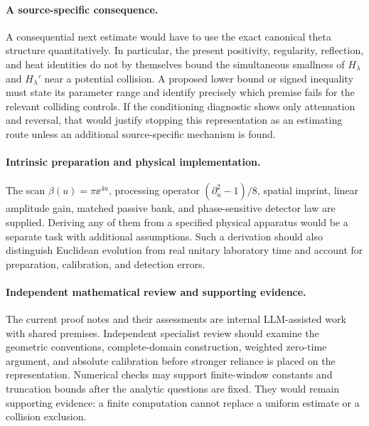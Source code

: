 \paragraph{A source-specific consequence.}
A consequential next estimate would have to use the exact canonical
theta structure quantitatively. In particular, the present positivity,
regularity, reflection, and heat identities do not by themselves bound
the simultaneous smallness of $H_\lambda$ and $H_\lambda'$ near a
potential collision. A proposed lower bound or signed inequality must
state its parameter range and identify precisely which premise fails
for the relevant colliding controls. If the conditioning diagnostic
shows only attenuation and reversal, that would justify stopping this
representation as an estimating route unless an additional
source-specific mechanism is found.

\paragraph{Intrinsic preparation and physical implementation.}
The scan $\beta(u)=\pi\ee^{4u}$, processing operator
$(\partial_u^2-1)/8$, spatial imprint, linear amplitude gain, matched
passive bank, and phase-sensitive detector law are supplied. Deriving
any of them from a specified physical apparatus would be a separate
task with additional assumptions. Such a derivation should also
distinguish Euclidean evolution from real unitary laboratory time and
account for preparation, calibration, and detection errors.

\paragraph{Independent mathematical review and supporting evidence.}
The current proof notes and their assessments are internal LLM-assisted
work with shared premises. Independent specialist review should
examine the geometric conventions, complete-domain construction,
weighted zero-time argument, and absolute calibration before stronger
reliance is placed on the representation. Numerical checks may support
finite-window constants and truncation bounds after the analytic
questions are fixed. They would remain supporting evidence: a finite
computation cannot replace a uniform estimate or a collision exclusion.
